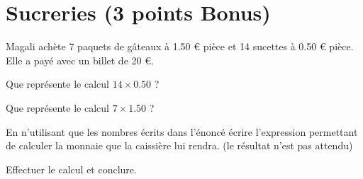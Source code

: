 \section{Sucreries (3 points Bonus)}

Magali achète 7 paquets de gâteaux à \num{1.50} € pièce et 14 sucettes à \num{0.50} € pièce. Elle a payé avec un billet de 20 €.

\begin{questions}
	\question[\half] Que représente le calcul $14 \times \num{0.50}$ ?

	\question[\half] Que représente le calcul $7 \times \num{1.50}$ ?
	
	\question[1] En n'utilisant que les nombres écrits dans l'énoncé écrire l'expression permettant de calculer la monnaie que la caissière lui rendra. (le résultat n'est pas attendu)
		
	\question[1] Effectuer le calcul et conclure. 

	
\end{questions}